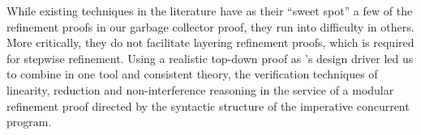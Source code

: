 While existing techniques in the literature have as their
``sweet spot'' a few of the refinement proofs in our garbage collector
proof, they run into difficulty in others. 
More critically, they
do not facilitate layering refinement proofs, which is required for stepwise
refinement. 
Using a realistic top-down proof as \civl's design driver led us to
combine in one tool and consistent theory, the verification techniques
of linearity, reduction and non-interference reasoning in the service
of a modular refinement proof directed by the syntactic structure of
the imperative concurrent program. 

